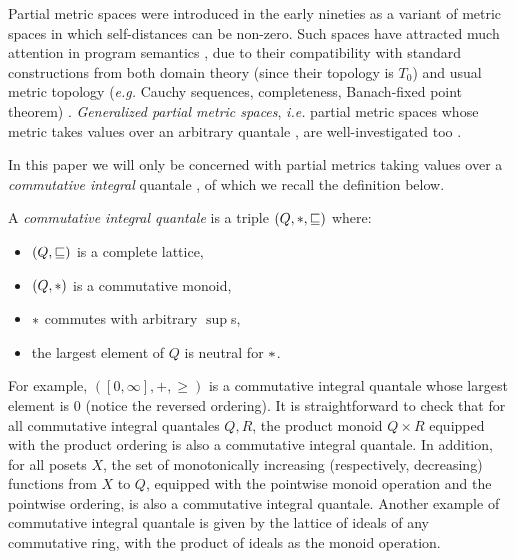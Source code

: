 



Partial metric spaces were  introduced in the early nineties as a variant of metric spaces in which self-distances can be non-zero. Such spaces have attracted much attention in program semantics
\cite{bkmp:partial-metrics, Bukatin1997, doi:10.1111/j.1749-6632.1994.tb44144.x, Schellekens2004, Samet:2013aa, Stubbe2018, HE201999}, due to their compatibility with standard constructions from both domain theory (since their topology is $T_{0}$) and usual metric topology (\textit{e.g.} Cauchy sequences, completeness, Banach-fixed point theorem) \cite{bkmp:partial-metrics, doi:10.1111/j.1749-6632.1994.tb44144.x}.
\emph{Generalized partial metric spaces}, \textit{i.e.} partial metric spaces whose metric takes values over an arbitrary quantale \cite{Hofmann2014}, are well-investigated too \cite{AGT2000,AGT7849}. 

In this paper we will only be concerned with partial metrics taking values over a \emph{commutative integral} quantale \cite{Hofmann2014}, of which we recall the definition below.

\begin{definition} A \emph{commutative integral quantale} is a triple $(Q, \mathbin{\ast}, \sqsubseteq)$ where:
\begin{itemize}
\item $(Q, \sqsubseteq)$ is a complete lattice,
\item $(Q, \mathbin{\ast})$ is a commutative monoid,
\item $\mathbin{\ast}$ commutes with arbitrary $\sup$s,
\item the largest element of $Q$ is neutral for $\mathbin{\ast}$.
\end{itemize}
\end{definition}

For example, $([0,\infty], +, \geq)$ is a commutative integral quantale whose largest element is $0$ (notice the reversed ordering). It is straightforward to check that for all commutative integral quantales $Q,R$, the product monoid $Q \times R$ equipped with the product ordering is also a commutative integral quantale. In addition, for all posets $X$, the set of monotonically increasing (respectively, decreasing) functions from $X$ to $Q$, equipped with the pointwise monoid operation and the pointwise ordering, is also a commutative integral quantale. Another example of commutative integral quantale is given by the lattice of ideals of any commutative ring, with the product of ideals as the monoid operation.


